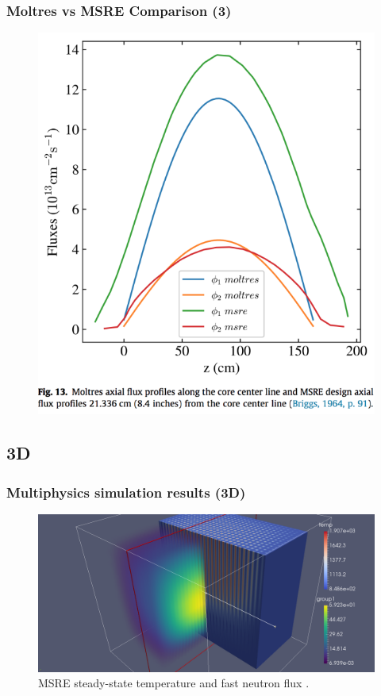 \begin{frame}
  \frametitle{Moltres vs MSRE Comparison (3)}
  \begin{figure}[t]
   \includegraphics[height=0.85\textheight]{./images/msre_axial_flux.png}
    \end{figure}

\end{frame}

\subsection{3D}
\begin{frame}
  \frametitle{Multiphysics simulation results (3D)}
  \begin{figure}[t]
   \vspace{-0.15in}
   \hspace*{-0.8in}
   \includegraphics[height=0.8\textheight]{./images/moltres_3D.png}
   \caption{\gls{MSRE} steady-state temperature and fast neutron flux \cite{ridley_introduction_2017}.}
    \end{figure}
\end{frame}

